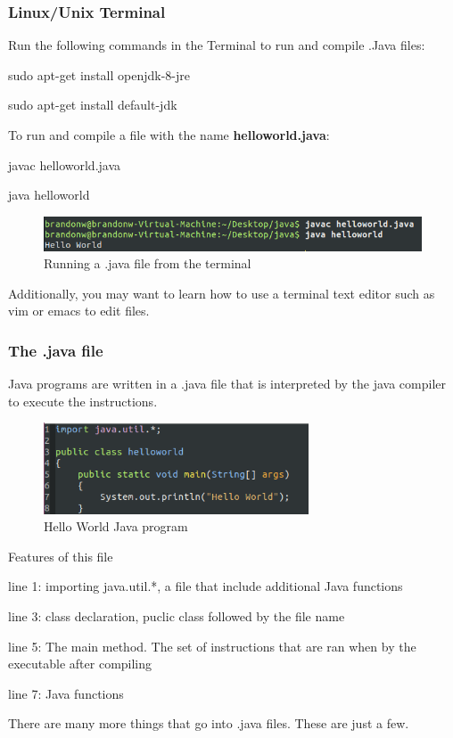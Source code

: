 \documentclass{article}
\begin{document}
\subsubsection{Linux/Unix Terminal}
Run the following commands in the Terminal to run and compile .Java files:
\begin{steps}
	\item sudo apt-get install openjdk-8-jre
	\item sudo apt-get install default-jdk
\end{steps}
To run and compile a file with the name \textbf{helloworld.java}:
\begin{steps}
	\item javac helloworld.java
	\item java helloworld
\end{steps}
\begin{figure}[h]
	\centering
	\includegraphics[width=0.7\linewidth]{runningjavafileonterminal}
	\caption[]{Running a .java file from the terminal}
	\label{fig:runningjavafileonterminal}
\end{figure}
Additionally, you may want to learn how to use a terminal text editor such as vim or emacs to edit files.
\subsubsection{The .java file}
Java programs are written in a .java file that is interpreted by the java compiler to execute the instructions.
\begin{figure}[h]
	\centering
	\includegraphics[width=0.7\textwidth]{helloworld}
	\caption[]{Hello World Java program}
	\label{fig}
\end{figure}
Features of this file
\begin{steps}
	\item line 1: importing java.util.*, a file that include additional Java functions
	\item line 3: class declaration, puclic class followed by the file name
	\item line 5: The main method. The set of instructions that are ran when by the executable after compiling
	\item line 7: Java functions
\end{steps}
There are many more things that go into .java files. These are just a few.
\end{document}
